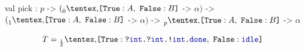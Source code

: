 
\begin{frame}[fragile]{\insertsection}
	\begin{table}[htb]
	    \begin{OCamlD}[basicstyle=\scriptsize,frame=single]
              val pick : $p$ -> $(\BinaryPChoice[0]{\etvarA}{\etvarB}$ -> $\alpha)$
                           -> $(\BinaryPChoice[1]{\etvarA}{\etvarB}$ -> $\alpha)$
                           -> $\BinaryPChoice[p]{\etvarA}{\etvarB}$ -> $\alpha$
	    \end{OCamlD}
	\end{table}
	\CoinFlipSumServer[basicstyle=\footnotesize]

	\begin{equation*}
		\SessionType = \BinaryPChoice[\frac{1}{2}]{
			\In\tint{\In\tint{\Out\tint{\Done}}}
			}{\Idle}
	\end{equation*}
\end{frame}

